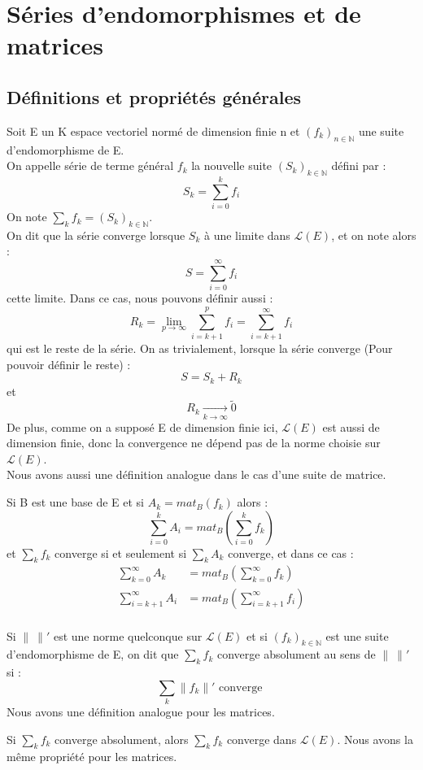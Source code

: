 \chapter{Séries d'endomorphismes et de matrices}
\section{Définitions et propriétés générales}
\begin{de}
Soit E un K espace vectoriel normé de dimension finie n et $(f_k)_{n \in \mathbb{N}}$ une suite d'endomorphisme de E.\\
On appelle série de terme général $f_k$ la nouvelle suite $(S_k)_{k \in \mathbb{N}}$ défini par : 
$$S_k = \sum_{i=0}^k f_i$$
On note $\underset{k}\sum f_k = (S_k)_{k \in \mathbb{N}}$.\\
On dit que la série converge lorsque $S_k$ à une limite dans $\mathcal{L}(E)$, et on note alors : 
$$S = \sum_{i=0}^{\infty} f_i$$
cette limite. Dans ce cas, nous pouvons définir aussi : 
$$R_k = \lim_{p \rightarrow \infty} \sum_{i=k+1}^p f_i = \sum_{i=k+1}^{\infty} f_i$$
qui est le reste de la série. On as trivialement, lorsque la série converge (Pour pouvoir définir le reste) : 
$$S = S_k + R_k$$
et 
$$R_k \underset{k \rightarrow \infty}\rightarrow \tilde{0}$$
De plus, comme on a supposé E de dimension finie ici, $\mathcal{L}(E)$ est aussi de dimension finie, donc la convergence ne dépend pas de la norme choisie sur $\mathcal{L}(E)$.\\
Nous avons aussi une définition analogue dans le cas d'une suite de matrice.
\end{de}
\begin{prop}
Si B est une base de E et si $A_k = mat_B(f_k)$ alors : 
$$\sum_{i=0}^k A_i = mat_B(\sum_{i=0}^k f_k)$$
et $\underset{k} \sum f_k$ converge si et seulement si $\underset{k}\sum A_k$ converge, et dans ce cas : 
\begin{align*}
 \sum_{k=0}^{\infty} A_k &= mat_B(\sum_{k=0}^{\infty} f_k) \\
  \sum_{i=k+1}^{\infty} A_i &= mat_B(\sum_{i=k+1}^{\infty} f_i) \\
\end{align*}
\end{prop}
\begin{de}
Si $\parallel~\parallel'$ est une norme quelconque sur $\mathcal{L}(E)$ et si $(f_k)_{k \in \mathbb{N}}$ est une suite d'endomorphisme de E, on dit que $\underset{k}\sum f_k$ converge absolument au sens de $\parallel~\parallel'$ si :
$$\underset{k}\sum \parallel f_k\parallel' \text{ converge }$$
Nous avons une définition analogue pour les matrices.
\end{de}
\begin{prop}
Si $\underset{k} \sum f_k$ converge absolument, alors $\underset{k} \sum f_k$ converge dans $\mathcal{L}(E)$. Nous avons la même propriété pour les matrices. 
\end{prop}
